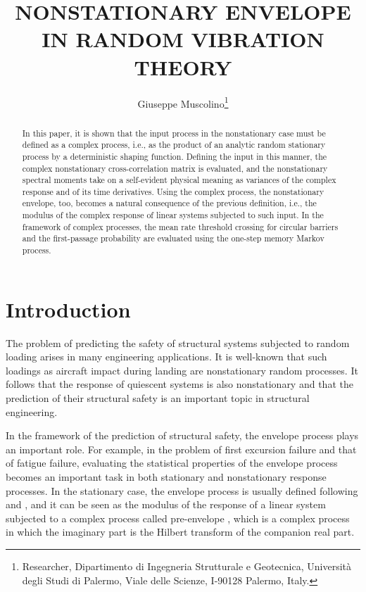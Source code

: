 \documentclass[11pt]{article}
\title{NONSTATIONARY ENVELOPE IN RANDOM VIBRATION THEORY}
\author{Giuseppe Muscolino\footnote{Researcher, Dipartimento di Ingegneria Strutturale e Geotecnica, Universit\`{a} degli Studi di Palermo, Viale delle Scienze, I-90128 Palermo, Italy.}}
\date{}
\begin{document}
\maketitle

\begin{abstract}
In this paper, it is shown that the input process in the nonstationary case must be defined as a complex process, i.e., as the product of an analytic random stationary process by a deterministic shaping function. Defining the input in this manner, the complex nonstationary cross-correlation matrix is evaluated, and the nonstationary spectral moments take on a self-evident physical meaning as variances of the complex response and of its time derivatives. Using the complex process, the nonstationary envelope, too, becomes a natural consequence of the previous definition, i.e., the modulus of the complex response of linear systems subjected to such input. In the framework of complex processes, the mean rate threshold crossing for circular barriers and the first-passage probability are evaluated using the one-step memory Markov process.
\end{abstract}

\section{Introduction}
\label{sec:introduction}

The problem of predicting the safety of structural systems subjected to random loading arises in many engineering applications. It is well-known that such loadings as aircraft impact during landing are nonstationary random processes. It follows that the response of quiescent systems is also nonstationary and that the prediction of their structural safety is an important topic in structural engineering.

In the framework of the prediction of structural safety, the envelope process \cite{langley1986} plays an important role. For example, in the problem of first excursion failure and that of fatigue failure, evaluating the statistical properties of the envelope process becomes an important task in both stationary \cite{yang1971} and nonstationary \cite{yang1972} response processes. In the stationary case, the envelope process is usually defined following \cite{dugundji1958} and \cite{cramer1967}, and it can be seen as the modulus of the response of a linear system subjected to a complex process called pre-envelope \cite{arens1957,dugundji1958}, which is a complex process in which the imaginary part is the Hilbert transform of the companion real part.
\end{document}
